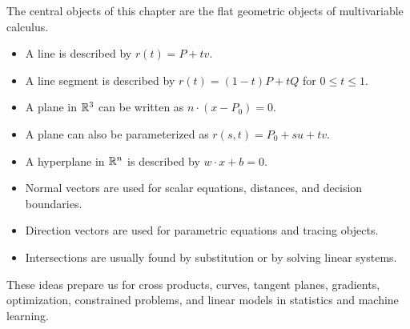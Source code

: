 The central objects of this chapter are the flat geometric objects of multivariable calculus.
\begin{itemize}
\item A line is described by $r(t)=P+tv$.
\item A line segment is described by $r(t)=(1-t)P+tQ$ for $0\le t\le 1$.
\item A plane in $\mathbb{R}^3$ can be written as $n\cdot(x-P_0)=0$.
\item A plane can also be parameterized as $r(s,t)=P_0+su+tv$.
\item A hyperplane in $\mathbb{R}^n$ is described by $w\cdot x+b=0$.
\item Normal vectors are used for scalar equations, distances, and decision boundaries.
\item Direction vectors are used for parametric equations and tracing objects.
\item Intersections are usually found by substitution or by solving linear systems.
\end{itemize}

These ideas prepare us for cross products, curves, tangent planes, gradients, optimization, constrained problems, and linear models in statistics and machine learning.


